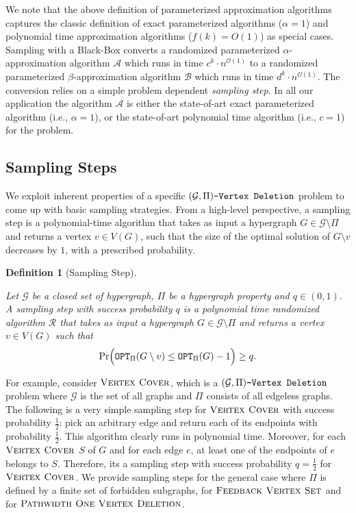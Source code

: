 \documentclass[letterpaper,11pt]{article}
\newcommand{\1}[1]{\mathds{1}\left[#1\right]}
\newcommand{\OPT}{\textnormal{\texttt{OPT}}}
\newcommand{\Oh}{\mathcal{O}}
\newtheorem{definition}[theorem]{Definition}
\newcommand{\gpivd}[1][\mathcal{G},\Pi]{(#1)\textnormal{\texttt{-Vertex Deletion}}}
\newcommand{\cG}{\mathcal{G}}
\newcommand{\vc}{\textsc{Vertex Cover}\xspace}
\newcommand{\fvs}{\textsc{Feedback Vertex Set}\xspace}
\newcommand{\povd}{\textsc{Pathwidth One Vertex Deletion}\xspace}
\begin{document}
We note that the above definition of parameterized approximation algorithms captures the classic definition of exact parameterized algorithms ($\alpha=1$) and polynomial time approximation algorithms ($f(k) = O(1)$) as special cases. 
Sampling with a Black-Box converts a randomized parameterized  $\alpha$-approximation algorithm   $\mathcal{A}$ which runs in time $c^k\cdot n^{\Oh(1)}$ to a randomized parameterized  $\beta$-approximation algorithm $\mathcal{B}$  which runs in time $d^k\cdot n^{\Oh(1)}$. 
The conversion relies on a simple  problem dependent {\em sampling step}.
In all our application the algorithm $\mathcal{A}$ is either the state-of-art exact parameterized algorithm  (i.e., $\alpha=1$), or the state-of-art polynomial time algorithm (i.e., $c=1$) for the problem. 

\subsection{Sampling Steps}\label{sec:sampling_step_subsec}
We exploit inherent properties of a specific $\gpivd$  problem to come up with
basic sampling strategies.
From a high-level perspective, a sampling step is a polynomial-time algorithm that takes as input a hypergraph $G \in \mathcal{G} \setminus \Pi$ and returns a vertex $v \in V(G)$,
such that the size of the optimal solution of $G\setminus v$ decreases by $1$, with a prescribed probability.

\begin{definition}[Sampling Step]\label{definition:sampling_step}
	
	Let $\cG$ be a closed set of hypergraph, $\Pi$ be a hypergraph property and $q\in (0,1)$. A {\em sampling step with success probability $q$} is a  polynomial time randomized algorithm $\mathcal{R}$
	that takes as input a hypergraph $G \in \mathcal{G} \setminus \Pi$ and  returns a vertex $v \in V(G)$ such that 
		 $$\Pr\Bigl( \OPT_\Pi(G \setminus v) \leq \OPT_\Pi(G) - 1 \Bigr) \geq q.$$
\end{definition}

For example, consider
$\vc$,  which is a $\gpivd$ problem where $\mathcal{G}$ is the set of all
graphs and $\Pi$ consists of all edgeless graphs. The following is a very
simple sampling step for $\vc$ with success probability $\frac{1}{2}$:
pick an arbitrary edge and return each of its endpoints with probability
$\frac{1}{2}$. This algorithm clearly runs in polynomial time. Moreover, for
each $\vc$ $S$ of $G$ and for each edge $e$, at least one of the endpoints of  $e$  belongs to $S$. Therefore, its a sampling step with success probability $q=\frac{1}{2}$ for $\vc$. We provide sampling steps for the general case where $\Pi$ is defined by a finite set of forbidden subgraphs, for $\fvs$ and for $\povd$.
\end{document}
